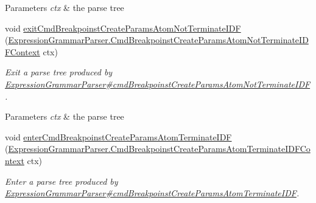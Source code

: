 \begin{DoxyCompactItemize}
\begin{DoxyCompactList}
\begin{DoxyParams}{Parameters}
{\em ctx} & the parse tree\\
\hline
\end{DoxyParams}
 \end{DoxyCompactList}\item 
void \hyperlink{classgov_1_1nasa_1_1jpf_1_1inspector_1_1server_1_1expression_1_1parser_1_1_expression_grammar_base_listener_ab091950acd7f635d9b006d068b68e588}{exit\+Cmd\+Breakpoinst\+Create\+Params\+Atom\+Not\+Terminate\+I\+DF} (\hyperlink{classgov_1_1nasa_1_1jpf_1_1inspector_1_1server_1_1expression_1_1parser_1_1_expression_grammar_paee196826319d0ea00470866a7ffd8d7b}{Expression\+Grammar\+Parser.\+Cmd\+Breakpoinst\+Create\+Params\+Atom\+Not\+Terminate\+I\+D\+F\+Context} ctx)
\begin{DoxyCompactList}\small\item\em Exit a parse tree produced by \hyperlink{classgov_1_1nasa_1_1jpf_1_1inspector_1_1server_1_1expression_1_1parser_1_1_expression_grammar_parser_a877ec76515f792b811174f247de762a6}{Expression\+Grammar\+Parser\#cmd\+Breakpoinst\+Create\+Params\+Atom\+Not\+Terminate\+I\+DF}.


\begin{DoxyParams}{Parameters}
{\em ctx} & the parse tree\\
\hline
\end{DoxyParams}
 \end{DoxyCompactList}\item 
void \hyperlink{classgov_1_1nasa_1_1jpf_1_1inspector_1_1server_1_1expression_1_1parser_1_1_expression_grammar_base_listener_ad4d761216c63d247e046b297b4c3e0d6}{enter\+Cmd\+Breakpoinst\+Create\+Params\+Atom\+Terminate\+I\+DF} (\hyperlink{classgov_1_1nasa_1_1jpf_1_1inspector_1_1server_1_1expression_1_1parser_1_1_expression_grammar_pa33db42909734e187834b73b54c5beb59}{Expression\+Grammar\+Parser.\+Cmd\+Breakpoinst\+Create\+Params\+Atom\+Terminate\+I\+D\+F\+Context} ctx)
\begin{DoxyCompactList}\small\item\em Enter a parse tree produced by \hyperlink{classgov_1_1nasa_1_1jpf_1_1inspector_1_1server_1_1expression_1_1parser_1_1_expression_grammar_parser_a67979d89277e44ddae7fa8ab4a4d8cfb}{Expression\+Grammar\+Parser\#cmd\+Breakpoinst\+Create\+Params\+Atom\+Terminate\+I\+DF}.



\end{DoxyCompactList}
\end{DoxyCompactItemize}
